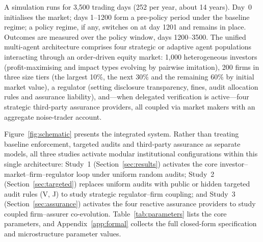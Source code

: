 \documentclass[11pt]{article}
\begin{document}
A simulation runs for 3,500 trading days (252 per year, about 14 years). Day~0 initialises the market; days 1--1200 form a pre-policy period under the baseline regime; a policy regime, if any, switches on at day 1201 and remains in place. Outcomes are measured over the policy window, days 1200--3500. The unified multi-agent architecture comprises four strategic or adaptive agent populations interacting through an order-driven equity market: 1,000 heterogeneous investors (profit-maximising and impact types evolving by pairwise imitation), 200 firms in three size tiers (the largest 10\%, the next 30\% and the remaining 60\% by initial market value), a regulator (setting disclosure transparency, fines, audit allocation rules and assurance liability), and---when delegated verification is active---four strategic third-party assurance providers, all coupled via market makers with an aggregate noise-trader account.

Figure~\ref{fig:schematic} presents the integrated system. Rather than treating baseline enforcement, targeted audits and third-party assurance as separate models, all three studies activate modular institutional configurations within this single architecture: Study~1 (Section~\ref{sec:results}) activates the core investor--market--firm--regulator loop under uniform random audits; Study~2 (Section~\ref{sec:targeted}) replaces uniform audits with public or hidden targeted audit rules (V, J) to study strategic regulator--firm coupling; and Study~3 (Section~\ref{sec:assurance}) activates the four reactive assurance providers to study coupled firm--assurer co-evolution. Table~\ref{tab:parameters} lists the core parameters, and Appendix~\ref{app:formal} collects the full closed-form specification and microstructure parameter values.
\end{document}
